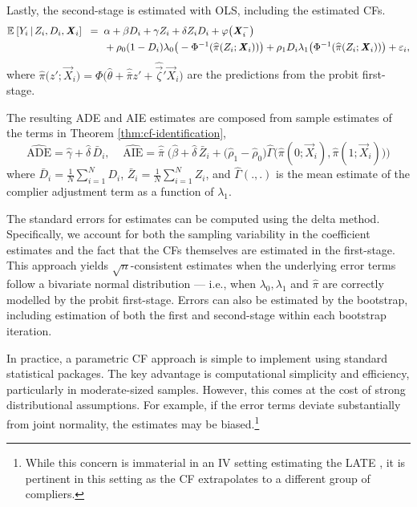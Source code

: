 Lastly, the second-stage is estimated with OLS, including the estimated CFs.
\begin{align*}
    \mathbb{E}_{} \left[ Y_i \, \middle\vert \, Z_i, D_i, \boldsymbol{\mathit{X}}_i \right] \;\; =& \;\;
        \alpha
        + \beta D_i
        + \gamma Z_i
        + \delta Z_i D_i
        + \varphi\big(\boldsymbol{\mathit{X}}_i^-\big) \\
        & \;\; + \rho_0 (1 - D_i) \lambda_0 \big( -\Phi^{-1}(\widehat{\pi}(Z_i; \boldsymbol{\mathit{X}}_i)) \big)
    + \rho_1 D_i \lambda_1\big( \Phi^{-1}(\widehat{\pi}(Z_i; \boldsymbol{\mathit{X}}_i)) \big)
    + \varepsilon_i,
\end{align*}
where $\hat\pi \big(z';\vec X_i \big) = \Phi \Big( \hat\theta + \hat{\bar\pi} z' + \hat{\vec\zeta}' \vec X_i \Big)$ are the predictions from the probit first-stage.

The resulting ADE and AIE estimates are composed from sample estimates of the terms in Theorem \ref{thm:cf-identification},
\[ \hat{\text{ADE}}
    = \hat{\gamma} + \hat{\delta}\,\bar D_i, \;\;\;\;
    \hat{\text{AIE}}
    = \hat{\bar\pi}\; \Big(
        \hat{\beta} + \hat{\delta}\,\bar Z_i 
        + \big(\hat \rho_1 - \hat \rho_0 \big)
        \hat \Gamma \big( \hat\pi(0;\vec X_i), \hat\pi(1;\vec X_i)\big) \Big) \]
where $\bar D_i = \frac1N \sum_{i=1}^N D_i$, $\bar Z_i = \frac1N \sum_{i=1}^N Z_i$, and $\hat\Gamma(.,.)$ is the mean estimate of the complier adjustment term as a function of $\lambda_1$.

The standard errors for estimates can be computed using the delta method.
Specifically, we account for both the sampling variability in the coefficient estimates and the fact that the CFs themselves are estimated in the first-stage.
This approach yields $\sqrt{n}$-consistent estimates when the underlying error terms follow a bivariate normal distribution --- i.e., when $\lambda_0, \lambda_1$ and $\hat\pi$ are correctly modelled by the probit first-stage.
Errors can also be estimated by the bootstrap, including estimation of both the first and second-stage within each bootstrap iteration.

In practice, a parametric CF approach is simple to implement using standard statistical packages.
The key advantage is computational simplicity and efficiency, particularly in moderate-sized samples.
However, this comes at the cost of strong distributional assumptions.
For example, if the error terms deviate substantially from joint normality, the estimates may be biased.\footnote{
    While this concern is immaterial in an IV setting estimating the LATE \citep{kline2019heckits}, it is pertinent in this setting as the CF extrapolates to a different group of compliers.
}

